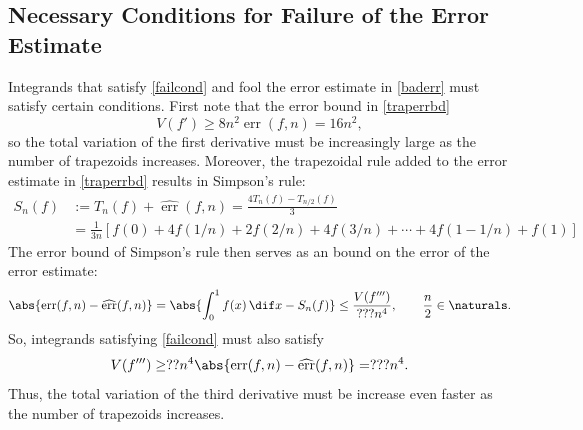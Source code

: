 \documentclass[]{amsart}
\DeclareMathOperator{\err}{err}
\newcommand{\herr}{\widehat{\err}}
\theoremstyle{definition}
\theoremstyle{remark}
\begin{document}
\subsection{Necessary Conditions for Failure of the Error Estimate} 
Integrands that satisfy \eqref{failcond} and fool the error estimate in \eqref{baderr} must satisfy certain conditions.  First note that the error bound in \eqref{traperrbd}
\[
V(f') \ge 8n^2 \err(f,n) =  16n^2,
\]
so the total variation of the first derivative must be increasingly large as the number of trapezoids increases.  Moreover, the trapezoidal rule added to the error estimate in \eqref{traperrbd} results in Simpson's rule:
\begin{align*}
S_n(f) &:= T_n(f) + \herr(f,n) = \frac{4T_n(f) - T_{n/2}(f)}{3} \\
& = \frac{1}{3n} \left [ f(0) + 4 f(1/n) + 2 f(2/n) + 4 f(3/n) + \cdots + 4 f(1-1/n) + f(1) \right]
\end{align*}
The error bound of Simpson's rule then serves as an bound on the error of the error estimate:
\begin{equation} \label{Simperrbd}
\abs{\err(f,n) - \herr(f,n)} = \abs{\int_0^1 f(x) \, \dif x - S_n(f)} \le \frac{V(f''')}{???n^4}, \qquad \frac{n}2 \in \naturals. 
\end{equation}
So, integrands satisfying \eqref{failcond} must also satisfy
\[
V(f''') \ge ??n^4 \abs{\err(f,n) - \herr(f,n)} =  ???n^4.
\]
Thus, the total variation of the third derivative must be increase even faster as the number of trapezoids increases.
\end{document}
